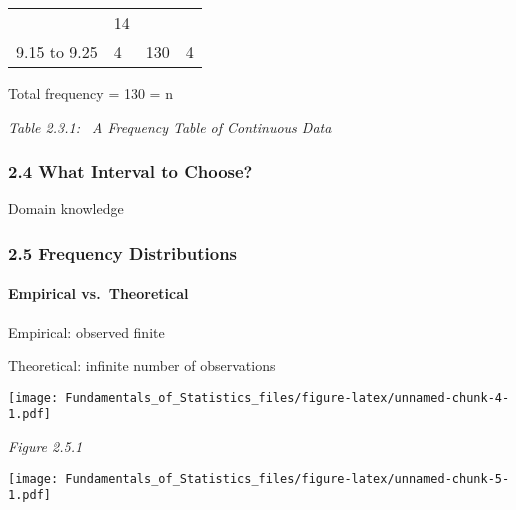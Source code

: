 \documentclass[]{article}
\let\oldparagraph\paragraph
\renewcommand{\paragraph}[1]{\oldparagraph{#1}\mbox{}}
\begin{document}
\begin{longtable}[]{@{}llll@{}}
\begin{minipage}[t]{0.22\columnwidth}
\end{minipage} & \begin{minipage}[t]{0.22\columnwidth}\raggedright
14\strut
\end{minipage}\tabularnewline
\begin{minipage}[t]{0.22\columnwidth}\raggedright
9.15 to 9.25\strut
\end{minipage} & \begin{minipage}[t]{0.22\columnwidth}\raggedright
4\strut
\end{minipage} & \begin{minipage}[t]{0.22\columnwidth}\raggedright
130\strut
\end{minipage} & \begin{minipage}[t]{0.22\columnwidth}\raggedright
4\strut
\end{minipage}\tabularnewline
\bottomrule
\end{longtable}

Total frequency = 130 = n

\emph{Table 2.3.1: ~A Frequency Table of Continuous Data}

\hypertarget{what-interval-to-choose}{%
\subsubsection{2.4 What Interval to
Choose?}\label{what-interval-to-choose}}

Domain knowledge

\hypertarget{frequency-distributions-2}{%
\subsubsection{2.5 Frequency
Distributions}\label{frequency-distributions-2}}

\hypertarget{empirical-vs.-theoretical}{%
\paragraph{Empirical vs.~Theoretical}\label{empirical-vs.-theoretical}}

Empirical: observed finite

Theoretical: infinite number of observations

\texttt{[image: Fundamentals\_of\_Statistics\_files/figure-latex/unnamed-chunk-4-1.pdf]}

\emph{Figure 2.5.1}

\texttt{[image: Fundamentals\_of\_Statistics\_files/figure-latex/unnamed-chunk-5-1.pdf]}
\end{document}
